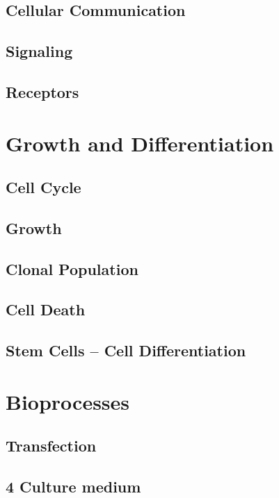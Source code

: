 \documentclass[12pt]{cheatsheet}
\begin{document}
\subsection*{Cellular Communication}

\subsection*{Signaling}

\subsection*{Receptors}

\vfill \null \columnbreak


\section*{Growth and Differentiation}
\subsection*{Cell Cycle}

\subsection*{Growth}

\subsection*{Clonal Population}

\subsection*{Cell Death}

\subsection*{Stem Cells – Cell Differentiation}


\section*{Bioprocesses}

\subsection*{Transfection}

\subsection*{4 Culture medium}

\end{document}
